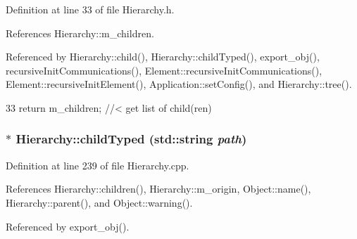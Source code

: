 Definition at line 33 of file Hierarchy.h.

References Hierarchy::m\_\-children.

Referenced by Hierarchy::child(), Hierarchy::childTyped(), export\_\-obj(), recursiveInitCommunications(), Element::recursiveInitCommunications(), Element::recursiveInitElement(), Application::setConfig(), and Hierarchy::tree().


\begin{DoxyCode}
33 { return m_children;  } //< get list of child(ren)
\end{DoxyCode}
\hypertarget{classHierarchy_a0c15a5276a3b80b4354d6bd8a01e0708}{
\subsubsection[{childTyped}]{ $\ast$ Hierarchy::childTyped (std::string {\em path})}}
\label{classHierarchy_a0c15a5276a3b80b4354d6bd8a01e0708}


Definition at line 239 of file Hierarchy.cpp.

References Hierarchy::children(), Hierarchy::m\_\-origin, Object::name(), Hierarchy::parent(), and Object::warning().

Referenced by export\_\-obj().


